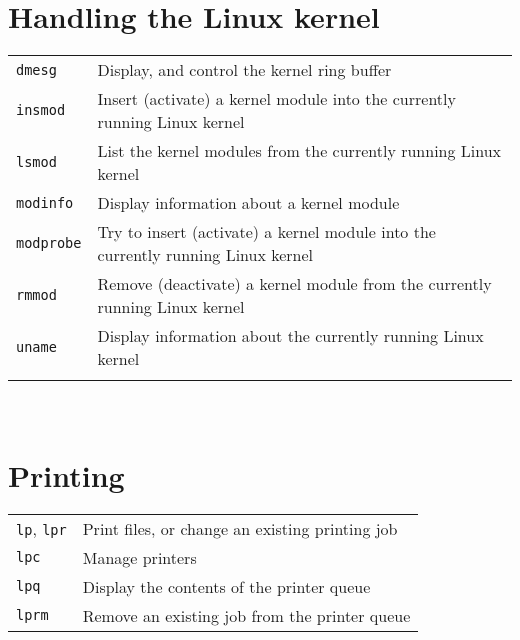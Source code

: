 \documentclass[10pt]{article}
\begin{document}
\begin{multicols}{2}
\section{Handling the Linux kernel}
\begin{tabular}{ p{2.5cm} p{8.5cm} }
  \hline
  \texttt{dmesg} & Display, and control the kernel ring buffer\\
  \texttt{insmod} & Insert (activate) a kernel module into the currently running Linux kernel\\
  \texttt{lsmod} & List the kernel modules from the currently running Linux kernel \\
  \texttt{modinfo} & Display information about a kernel module \\
  \texttt{modprobe} & Try to insert (activate) a kernel module into the currently running Linux kernel \\
  \texttt{rmmod} & Remove (deactivate) a kernel module from the currently running Linux kernel \\
  \texttt{uname} & Display information about the currently running Linux kernel\\
  \hline
  & \\
\end{tabular}

~\hfill

\section{Printing}
\begin{tabular}{ p{2.5cm} p{8.5cm} }
  \hline
  \texttt{lp}, \texttt{lpr} & Print files, or change an existing printing job\\
  \texttt{lpc} & Manage printers \\
  \texttt{lpq} & Display the contents of the printer queue\\
  \texttt{lprm} & Remove an existing job from the printer queue \\
  \hline
\end{tabular}


\end{multicols}
\end{document}
